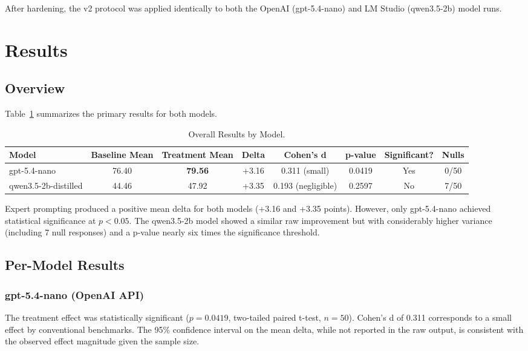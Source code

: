 \documentclass[anonymous, submission, paper]{iclr2026}
\begin{document}
After hardening, the v2 protocol was applied identically to both the OpenAI (gpt-5.4-nano) and LM Studio (qwen3.5-2b) model runs.

\section{Results}

\subsection{Overview}
\label{sec:results_overview}

Table~\ref{tab:overall_results} summarizes the primary results for both models.

\begin{table}[htbp]
  \centering
  \caption{Overall Results by Model.}
  \begin{tabular}{@{}lccccccc@{}}
    \toprule
    \textbf{Model} & \textbf{Baseline Mean} & \textbf{Treatment Mean} & \textbf{Delta} & \textbf{Cohen's d} & \textbf{p-value} & \textbf{Significant?} & \textbf{Nulls} \\
    \midrule
    gpt-5.4-nano & 76.40 & \textbf{79.56} & +3.16 & 0.311 (small) & 0.0419 & Yes & 0/50 \\
    qwen3.5-2b-distilled & 44.46 & 47.92 & +3.35 & 0.193 (negligible) & 0.2597 & No & 7/50 \\
    \bottomrule
  \end{tabular}
  \label{tab:overall_results}
\end{table}

Expert prompting produced a positive mean delta for both models (+3.16 and +3.35 points). However, only gpt-5.4-nano achieved statistical significance at $p < 0.05$. The qwen3.5-2b model showed a similar raw improvement but with considerably higher variance (including 7 null responses) and a p-value nearly six times the significance threshold.

\subsection{Per-Model Results}
\label{sec:per_model_results}

\subsubsection{gpt-5.4-nano (OpenAI API)}

The treatment effect was statistically significant ($p=0.0419$, two-tailed paired t-test, $n=50$). Cohen's d of 0.311 corresponds to a small effect by conventional benchmarks. The 95\% confidence interval on the mean delta, while not reported in the raw output, is consistent with the observed effect magnitude given the sample size.
\end{document}
